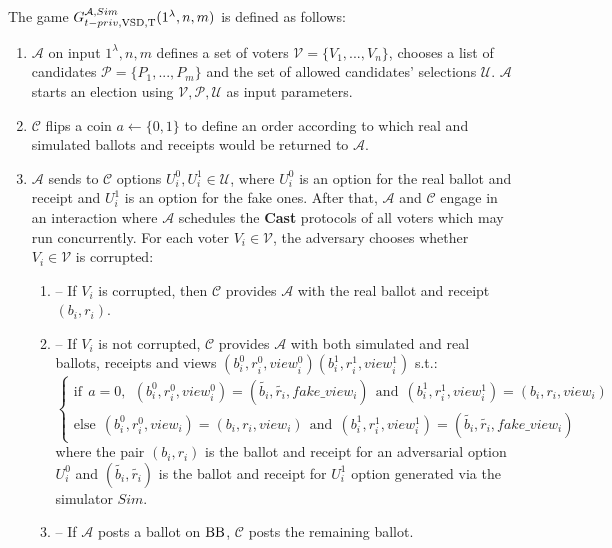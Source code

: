  
The game $G_{t-priv, \operatorname{VSD},\operatorname{T}}^{\mathcal{A},Sim}(1^{\lambda},n,m)$ is defined as follows:
\begin{enumerate} 
\item $\mathcal{A}$ on input $1^{\lambda},n,m$ defines a set of voters  $\mathcal{V} = \{V_1,...,V_n\}$, chooses a list of candidates  $\mathcal{P} = \{P_1,...,P_m\}$ and the set of allowed candidates' selections $\mathcal{U}$.  $\mathcal{A}$ starts an election using $\mathcal{V}, \mathcal{P}, \mathcal{U}$ as input parameters.
\item $\mathcal{C}$ flips a coin $a \leftarrow \{0,1\}$ to define an order according to which real and simulated ballots and receipts would be returned to $\mathcal{A}$.
\item   $\mathcal{A}$ sends to  $\mathcal{C}$ options $U_i^0, U_i^1 \in  \mathcal{U}$, where $U_i^0$ is an option for the real ballot and receipt and $U_i^1$ is an option for the fake ones.  After that, $\mathcal{A}$ and $\mathcal{C}$ engage in an interaction where $\mathcal{A}$ schedules the \textbf{Cast}   protocols of all voters which may run concurrently. For each voter $V_i \in \mathcal{V}$, the adversary chooses whether $V_i \in \mathcal{V}$ is corrupted: 
\begin{enumerate}
\item[] -- If $V_i$ is corrupted, then $\mathcal{C}$ provides $\mathcal{A}$ with the real ballot and receipt $(b_i,r_i)$.
\item[] --  If $V_i$ is not corrupted, $\mathcal{C}$  provides $\mathcal{A}$ with both simulated and real ballots, receipts and views $(b_i^0, r_i^0,view_i^0) (b_i^1, r_i^1,view_i^1)$ s.t.:\\
$ \begin{cases}
 \text{if} ~~a =0,~~ (b_i^0,r_i^0,view_i^0) = (\tilde{b_i},\tilde{r_i},fake\_view_i) ~~ \text{and} ~~  (b_i^1,r_i^1,view_i^1) = (b_i,r_i,view_i)   \\ 
 \text{else}~~ (b_i^0,r_i^0,view_i) =(b_i,r_i,view_i)~~  \text{and} ~~  (b_i^1,r_i^1,view_i^1) =(\tilde{b_i},\tilde{r_i},fake\_view_i)
\end{cases}$\\ 
where the pair $(b_i, r_i)$ is the ballot and receipt for an adversarial option $U_i^0$ and $(\tilde{b_i},\tilde{r_i})$ is the ballot and receipt for  $U_i^1$ option generated via the simulator $Sim$.
\item[] --  If  $\mathcal{A}$ posts a ballot on $\operatorname{BB}$, $\mathcal{C}$ posts the remaining ballot. 
\end{enumerate}

\end{enumerate}
